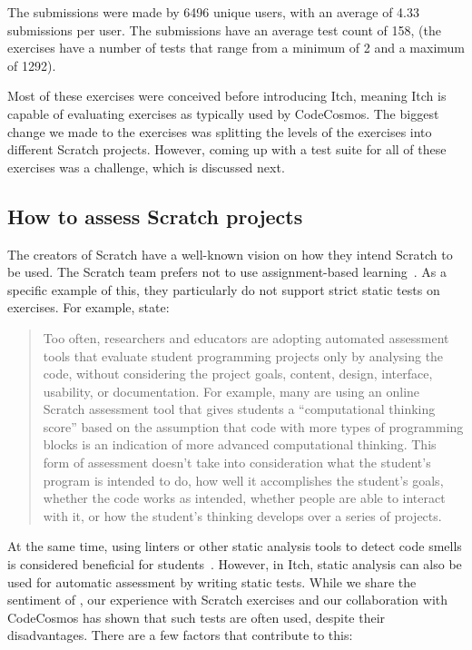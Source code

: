 \documentclass[../main]{subfiles}
\begin{document}
The submissions were made by \num{6496} unique users, with an average of \num{4.33} submissions per user.
The submissions have an average test count of \num{158}, (the exercises have a number of tests that range from a minimum of \num{2} and a maximum of \num{1292}).

Most of these exercises were conceived before introducing Itch, meaning Itch is capable of evaluating exercises as typically used by CodeCosmos.
The biggest change we made to the exercises was splitting the levels of the exercises into different Scratch projects.
However, coming up with a test suite for all of these exercises was a challenge, which is discussed next.

\subsection{How to assess Scratch projects}\label{subsec:how-to-evaluate-scratch-submissions}

The creators of Scratch have a well-known vision on how they intend Scratch to be used.
The Scratch team prefers not to use assignment-based learning~\autocite{resnickCodingCrossroads2020}.
As a specific example of this, they particularly do not support strict static tests on exercises.
For example, \citeauthor{resnickCodingCrossroads2020} state:

\begin{quotation}
    Too often, researchers and educators are adopting automated assessment tools that evaluate student programming projects only by analysing the code, without considering the project goals, content, design, interface, usability, or documentation.
    For example, many are using an online Scratch assessment tool that gives students a ``computational thinking score'' based on the assumption that code with more types of programming blocks is an indication of more advanced computational thinking.
    This form of assessment doesn't take into consideration what the student's program is intended to do, how well it accomplishes the student's goals, whether the code works as intended, whether people are able to interact with it, or how the student's thinking develops over a series of projects.
\end{quotation}

At the same time, using linters or other static analysis tools to detect code smells is considered beneficial for students~\autocite{hermansCodeSmellsHamper2016}.
However, in Itch, static analysis can also be used for automatic assessment by writing static tests.
While we share the sentiment of \citeauthor{resnickCodingCrossroads2020}, our experience with Scratch exercises and our collaboration with CodeCosmos has shown that such tests are often used, despite their disadvantages.
There are a few factors that contribute to this:
\end{document}
